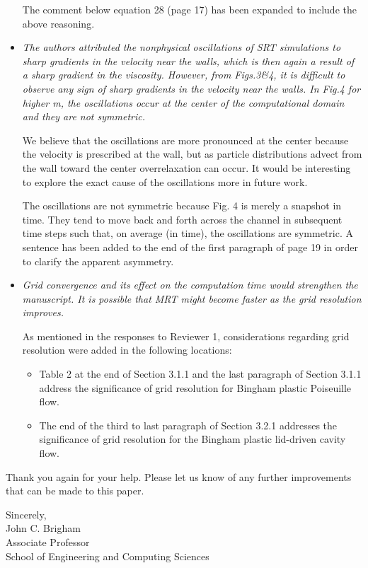 \documentclass{article}
\begin{document}
\begin{itemize}
	The comment below equation 28 (page 17) has been expanded to include the above reasoning.
	
	\item \emph{The authors attributed the nonphysical oscillations of SRT simulations to sharp gradients in the velocity near the walls, which is then again a result of a sharp gradient in the viscosity. However, from Figs.3\&4, it is difficult to observe any sign of sharp gradients in the velocity near the walls. In Fig.4 for higher m, the oscillations occur at the center of the computational domain and they are not symmetric.}
	
	We believe that the oscillations are more pronounced at the center because the velocity is prescribed at the wall, but as particle distributions advect from the wall toward the center overrelaxation can occur. It would be interesting to explore the exact cause of the oscillations more in future work.
	
	The oscillations are not symmetric because Fig. 4 is merely a snapshot in time. They tend to move back and forth across the channel in subsequent time steps such that, on average (in time), the oscillations are symmetric. A sentence has been added to the end of the first paragraph of page 19 in order to clarify the apparent asymmetry.
	
	\item \emph{Grid convergence and its effect on the computation time would strengthen the manuscript. It is possible that MRT might become faster as the grid resolution improves.}
	
	As mentioned in the responses to Reviewer 1, considerations regarding grid resolution were added in the following locations:
	\begin{itemize}
		\item Table 2 at the end of Section 3.1.1 and the last paragraph of Section 3.1.1 address the significance of grid resolution for Bingham plastic Poiseuille flow.
		\item The end of the third to last paragraph of Section 3.2.1 addresses the significance of grid resolution for the Bingham plastic lid-driven cavity flow.
	\end{itemize}
	
	\end{itemize}

Thank you again for your help. Please let us know of any further improvements that can be made to this paper.

\vspace{1in}
\noindent Sincerely, \\
\indent John C. Brigham \vspace{0.1in}\\
\indent Associate Professor \\
\indent School of Engineering and Computing Sciences
	
\end{document}
